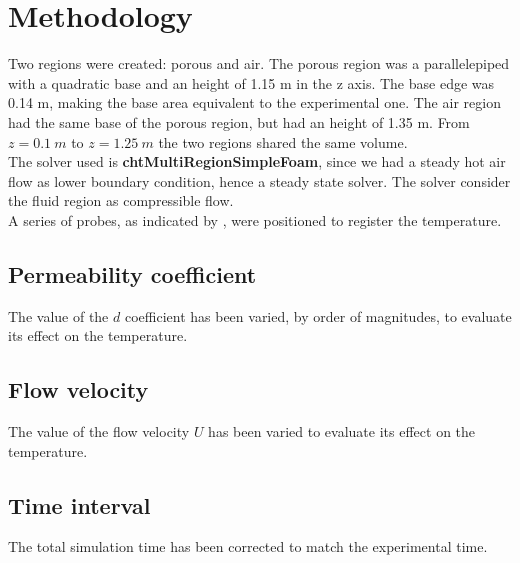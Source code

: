 
\section{Methodology}
\label{section:methodology}

Two regions were created: porous and air.
The porous region was a parallelepiped with a quadratic base and an height of
1.15 m in the z axis. The base edge was 0.14 m, making the base area
equivalent to the experimental one.
The air region had the same base of the porous region, but had an height of
1.35 m.
From $z=0.1 ~m$ to $z=1.25 ~m$ the two regions shared the same volume.\\
The solver used is \textbf{chtMultiRegionSimpleFoam}, since we had a steady hot
air flow as lower boundary condition, hence a steady state solver.
The solver consider the fluid region as compressible flow.\\
A series of probes, as indicated by \textcite{RegionProbe}, were positioned to
register the temperature.

\subsection{Permeability coefficient}
\label{subsection:permeabilitycoefficient}

The value of the $d$ coefficient has been varied, by order of magnitudes, to
evaluate its effect on the temperature.

\subsection{Flow velocity}
\label{subsection:flowvelocity}

The value of the flow velocity $U$ has been varied to
evaluate its effect on the temperature.

\subsection{Time interval}
\label{subsection:timeinterval}

The total simulation time has been corrected to match the experimental time.